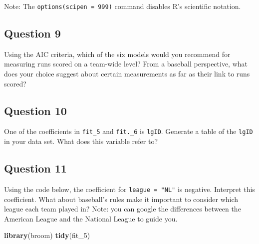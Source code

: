 \documentclass[]{article}
\newenvironment{Shaded}{\begin{snugshade}}{\end{snugshade}}
\newcommand{\DecValTok}[1]{\textcolor[rgb]{0.00,0.00,0.81}{#1}}
\newcommand{\KeywordTok}[1]{\textcolor[rgb]{0.13,0.29,0.53}{\textbf{#1}}}
\newcommand{\NormalTok}[1]{#1}
\begin{document}
Note: The \texttt{options(scipen\ =\ 999)} command disables R's
scientific notation.

\hypertarget{question-9}{%
\subsection{Question 9}\label{question-9}}

Using the AIC criteria, which of the six models would you recommend for
measuring runs scored on a team-wide level? From a baseball perspective,
what does your choice suggest about certain measurements as far as their
link to runs scored?

\hypertarget{question-10}{%
\subsection{Question 10}\label{question-10}}

One of the coefficients in \texttt{fit\_5} and \texttt{fit.\_6} is
\texttt{lgID}. Generate a table of the \texttt{lgID} in your data set.
What does this variable refer to?

\hypertarget{question-11}{%
\subsection{Question 11}\label{question-11}}

Using the code below, the coefficient for \texttt{league\ =\ "NL"} is
negative. Interpret this coefficient. What about baseball's rules make
it important to consider which league each team played in? Note: you can
google the differences between the American League and the National
League to guide you.

\begin{Shaded}
\begin{Highlighting}[]
\KeywordTok{library}\NormalTok{(broom)}
\KeywordTok{tidy}\NormalTok{(fit_}\DecValTok{5}\NormalTok{)}
\end{Highlighting}
\end{Shaded}
\end{document}
